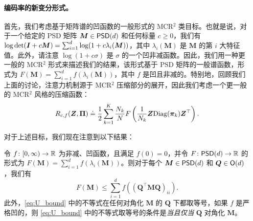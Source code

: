 \documentclass[../../book-main.tex]{subfiles}
\begin{document}

\paragraph{编码率的新变分形式。} 首先，我们考虑基于矩阵谱的凹函数的一般形式的 MCR$^2$ 类目标。也就是说，对于一个给定的 PSD 矩阵 $\bm M \in \mathsf{PSD}(d)$ 和任何标量 $c \geq 0$，我们有 $\log \det (\bm{I} + c \bm M) = \sum_{i=1}^{d} \log( 1 + c \lambda_i(\bm M))$，其中 $\lambda_i (\bm M)$ 是 $\bm M$ 的第 $i$ 大特征值。此外，请注意 $\log(1 + c \sigma)$ 是 $\sigma$ 的一个凹非减函数。因此，我们用一种更一般的 MCR$^2$ 形式来描述我们的结果，该形式基于 PSD 矩阵的一般谱函数，形式为 $F(\bm M) = \sum_{i=1}^{d} f(\lambda_i(\bm M))$，其中 $f$ 是凹且非减的。特别地，回顾我们上面的讨论，注意力机制源于 MCR$^2$ 压缩部分的展开，因此我们考虑一个更一般的 MCR$^2$ 风格的压缩函数：
\vspace{-2mm}
\begin{equation}
    R_{c,f}(\bm Z, \bm \Pi) \doteq \frac{1}{2}\sum_{k=1}^K \frac{N_k}{N} F\left( \frac{1}{N_k}\bm{Z} \mathrm{Diag}(\bm \pi_k) \bm{Z}^{\top} \right).
    \label{eq:mcr_c_gen}
\end{equation}



对于上述目标，我们现在注意到以下结果：
\begin{theorem}
\label{thm:var_concave}
    令 \(f \colon [0, \infty) \to \mathbb{R}\) 为非减、凹函数，且满足 \(f(0) = 0\)，并令 \(F \colon \mathsf{PSD}(d) \to \mathbb{R}\) 的形式为 \(F(\bm M) = \sum_{i = 1}^{d}f(\lambda_{i}(\bm M))\)。则对于每个 \(\bm M \in \mathsf{PSD}(d)\) 和 \(\bm Q \in \mathsf{O}(d)\)，我们有
    \begin{equation}
        \label{eq:U_bound}
        F(\bm M) \leq  \sum_{i=1}^{d} f\left( (\bm Q^{\top} \bm M \bm Q)_{ii} \right).
    \end{equation}
    此外，\eqref{eq:U_bound} 中的不等式在任何对角化 $\bm M$ 的 $\bm Q$ 下都取等号，如果 $f$ 是严格凹的，则 \eqref{eq:U_bound} 中的不等式取等号的条件是\textit{当且仅当} $\bm Q$ 对角化 $\bm M$。
\end{theorem}
\end{document}
